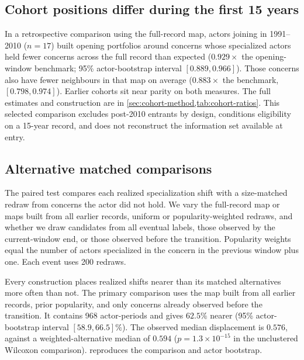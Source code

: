 \documentclass{fun_article}
\begin{document}
\subsection{Cohort positions differ during the first 15 years}\label{sec:secondary-structure-results}

In a retrospective comparison using the full-record map, actors joining in 1991--2010 ($n=17$) built opening portfolios around concerns whose specialized actors held fewer concerns across the full record than expected ($0.929\times$ the opening-window benchmark; 95\% actor-bootstrap interval $[0.889,0.966]$). Those concerns also have fewer neighbours in that map on average ($0.883\times$ the benchmark, $[0.798,0.974]$). Earlier cohorts sit near parity on both measures. The full estimates and construction are in \cref{sec:cohort-method,tab:cohort-ratios}. This selected comparison excludes post-2010 entrants by design, conditions eligibility on a 15-year record, and does not reconstruct the information set available at entry.

\subsection{Alternative matched comparisons}\label{sec:paired-null-robustness}
The paired test compares each realized specialization shift with a size-matched redraw from concerns the actor did not hold. We vary the full-record map or maps built from all earlier records, uniform or popularity-weighted redraws, and whether we draw candidates from all eventual labels, those observed by the current-window end, or those observed before the transition. Popularity weights equal the number of actors specialized in the concern in the previous window plus one. Each event uses 200 redraws.

Every construction places realized shifts nearer than its matched alternatives more often than not. The primary comparison uses the map built from all earlier records, prior popularity, and only concerns already observed before the transition. It contains 968 actor-periods and gives $62.5\%$ nearer (95\% actor-bootstrap interval $[58.9,66.5]\%$). The observed median displacement is $0.576$, against a weighted-alternative median of $0.594$ ($p=1.3\times10^{-15}$ in the unclustered Wilcoxon comparison). \texttt{} reproduces the comparison and actor bootstrap.
\end{document}
